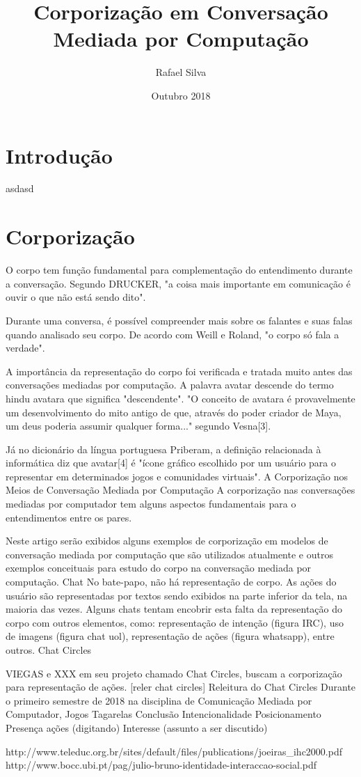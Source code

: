 \documentclass{article}
\title{Corporização em Conversação Mediada por Computação}
\author{Rafael Silva}
\date{Outubro 2018}
\begin{document}
\maketitle

\section{Introdução}

asdasd

\section{Corporização}

O corpo tem função fundamental para complementação do entendimento durante a conversação. Segundo DRUCKER, "a coisa mais importante em comunicação é ouvir o que não está sendo dito".

Durante uma conversa, é possível compreender mais sobre os falantes e suas falas quando analisado seu corpo. De acordo com Weill e Roland, "o corpo só fala a verdade".

A importância da representação do corpo foi verificada e tratada muito antes das conversações mediadas por computação. A palavra avatar descende do termo hindu avatara que significa "descendente". "O conceito de avatara é provavelmente um desenvolvimento do mito antigo de que, através do poder criador de Maya, um deus poderia assumir qualquer forma..." segundo Vesna[3].

Já no dicionário da língua portuguesa Priberam, a definição relacionada à informática diz que avatar[4] é "ícone gráfico escolhido por um usuário para o representar em determinados jogos e comunidades virtuais".
A Corporização nos Meios de Conversação Mediada por Computação
A corporização nas conversações mediadas por computador tem alguns aspectos fundamentais para o entendimentos entre os pares.

Neste artigo serão exibidos alguns exemplos de corporização em modelos de conversação mediada por computação que são utilizados atualmente e outros exemplos conceituais para estudo do corpo na conversação mediada por computação.
Chat
No bate-papo, não há representação de corpo. As ações do usuário são representadas por textos sendo exibidos na parte inferior da tela, na maioria das vezes. Alguns chats tentam encobrir esta falta da representação do corpo com outros elementos, como: representação de intenção (figura IRC), uso de imagens (figura chat uol), representação de ações (figura whatsapp), entre outros.
Chat Circles

VIEGAS e XXX em seu projeto chamado Chat Circles, buscam a corporização para representação de ações. [reler chat circles]
Releitura do Chat Circles
Durante o primeiro semestre de 2018 na disciplina de Comunicação Mediada por Computador, 
Jogos
Tagarelas
Conclusão
Intencionalidade
Posicionamento
Presença
ações (digitando)
Interesse (assunto a ser discutido)





http://www.teleduc.org.br/sites/default/files/publications/joeiras\_ihc2000.pdf
http://www.bocc.ubi.pt/pag/julio-bruno-identidade-interaccao-social.pdf
\end{document}
